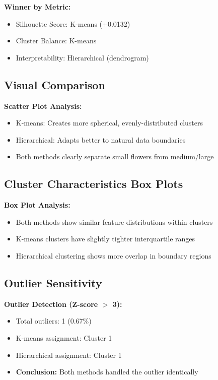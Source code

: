 \documentclass[12pt,a4paper]{article}
\begin{document}
\textbf{Winner by Metric:}
\begin{itemize}
    \item[$\checkmark$] Silhouette Score: K-means (+0.0132)
    \item[$\checkmark$] Cluster Balance: K-means
    \item[$\checkmark$] Interpretability: Hierarchical (dendrogram)
\end{itemize}

\subsection{Visual Comparison}

\textbf{Scatter Plot Analysis:}
\begin{itemize}
    \item K-means: Creates more spherical, evenly-distributed clusters
    \item Hierarchical: Adapts better to natural data boundaries
    \item Both methods clearly separate small flowers from medium/large
\end{itemize}

\subsection{Cluster Characteristics Box Plots}

\textbf{Box Plot Analysis:}
\begin{itemize}
    \item Both methods show similar feature distributions within clusters
    \item K-means clusters have slightly tighter interquartile ranges
    \item Hierarchical clustering shows more overlap in boundary regions
\end{itemize}

\subsection{Outlier Sensitivity}

\textbf{Outlier Detection (Z-score $>$ 3):}
\begin{itemize}
    \item Total outliers: 1 (0.67\%)
    \item K-means assignment: Cluster 1
    \item Hierarchical assignment: Cluster 1
    \item \textbf{Conclusion:} Both methods handled the outlier identically
\end{itemize}
\end{document}
